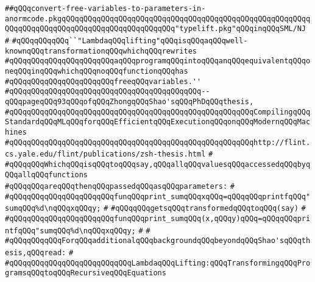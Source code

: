 \label{src/lib/compiler/back/top/improve/convert-free-variables-to-parameters-in-anormcode.pkg}
\verb|##qQQqconvert-free-variables-to-parameters-in-anormcode.pkgqQQqqQQqqQQqqQQqqQQqqQQqqQQqqQQqqQQqqQQqqQQqqQQqqQQqqQQqqQQqqQQqqQQqqQQqqQQqqQQqqQQqqQQqqQQqqQQq"typelift.pkg"qQQqinqQQqSML/NJ|\newline
\verb|#|\newline
\verb|#qQQqqQQqqQQq``"LambdaqQQqlifting"qQQqisqQQqaqQQqwell-knownqQQqtransformationqQQqwhichqQQqrewrites|\newline
\verb|#qQQqqQQqqQQqqQQqqQQqqQQqaqQQqprogramqQQqintoqQQqanqQQqequivalentqQQqoneqQQqinqQQqwhichqQQqnoqQQqfunctionqQQqhas|\newline
\verb|#qQQqqQQqqQQqqQQqqQQqqQQqfreeqQQqvariables.''|\newline
\verb|#qQQqqQQqqQQqqQQqqQQqqQQqqQQqqQQqqQQqqQQqqQQq--qQQqpageqQQq93qQQqofqQQqZhongqQQqShao'sqQQqPhDqQQqthesis,|\newline
\verb|#qQQqqQQqqQQqqQQqqQQqqQQqqQQqqQQqqQQqqQQqqQQqqQQqqQQqqQQqCompilingqQQqStandardqQQqMLqQQqforqQQqEfficientqQQqExecutionqQQqonqQQqModernqQQqMachines|\newline
\verb|#qQQqqQQqqQQqqQQqqQQqqQQqqQQqqQQqqQQqqQQqqQQqqQQqqQQqqQQqhttp://flint.cs.yale.edu/flint/publications/zsh-thesis.html|\newline
\verb|#|\newline
\verb|#qQQqqQQqWhichqQQqisqQQqtoqQQqsay,qQQqallqQQqvaluesqQQqaccessedqQQqbyqQQqallqQQqfunctions|\newline
\verb|#qQQqqQQqareqQQqthenqQQqpassedqQQqasqQQqparameters:|\newline
\verb|#|\newline
\verb|#qQQqqQQqqQQqqQQqqQQqqQQqfunqQQqprint_sumqQQqxqQQq=qQQqqQQqprintfqQQq"sumqQQq%d\nqQQqxqQQqy;|\newline
\verb|#|\newline
\verb|#qQQqqQQqgetsqQQqtransformedqQQqtoqQQq(say)|\newline
\verb|#|\newline
\verb|#qQQqqQQqqQQqqQQqqQQqqQQqfunqQQqprint_sumqQQq(x,qQQqy)qQQq=qQQqqQQqprintfqQQq"sumqQQq%d\nqQQqxqQQqy;|\newline
\verb|#|\newline
\verb|#|\newline
\verb|#qQQqqQQqqQQqForqQQqadditionalqQQqbackgroundqQQqbeyondqQQqShao'sqQQqthesis,qQQqread:|\newline
\verb|#|\newline
\verb|#qQQqqQQqqQQqqQQqqQQqqQQqqQQqLambdaqQQqLifting:qQQqTransformingqQQqProgramsqQQqtoqQQqRecursiveqQQqEquations|\newline
